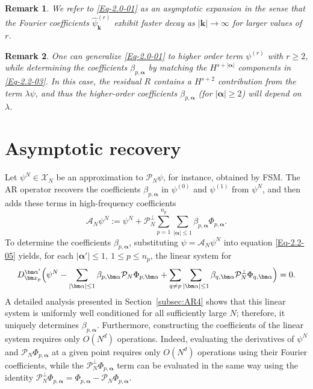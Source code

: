 \documentclass{sn-jnl}%
\numberwithin{equation}{section}
\theoremstyle{thmstyleone}%
\theoremstyle{thmstyletwo}%
\newtheorem{remark}{Remark}%
\theoremstyle{thmstylethree}%
\begin{document}
\begin{remark}
We refer to \eqref{Eq-2.0-01} as an asymptotic expansion in the sense that the Fourier coefficients  $\hat{\psi}_{\bm k}^{(r)}$  exhibit faster decay as $|\bm k|\to \infty$ for larger values of $r$.
\end{remark}
\begin{remark}
    One can generalize \eqref{Eq-2.0-01} to higher order term $\psi^{(r)}$ with $r\geq 2$, while determining the coefficients $\beta_{p,\bm \alpha}$ by matching the $H^{s+|\bm \alpha|}$ components in \eqref{Eq-2.2-03}.
    In this case, the residual $R$ contains a $H^{s+2}$ contribution from the term $\lambda\psi$, and thus the higher-order coefficients $\beta_{p,\bm \alpha}$ (for $|\bm \alpha| \geq 2 $) will depend on $\lambda$.
\end{remark}



\section{Asymptotic recovery}
\label{sec:postproc}
Let $\psi^N  \in \mathscr{X}_N$ be an approximation to $\mathcal{P}_N\psi$, for instance, obtained by FSM. The AR operator recovers the coefficients $\beta_{p,\bm \alpha}$ in $\psi^{(0)}$ and $\psi^{(1)}$ 
from $\psi^N$, and then adds these terms in high-frequency coefficients 
\begin{equation}
\label{Eq-3.0-01}
    \mathcal{A}_N\psi^N := \psi^N + \mathcal{P}^\perp_N\sum_{p=1}^{n_p}\sum_{|\bm \alpha|\leq 1}\beta_{p,\bm \alpha}\Phi_{p,\bm \alpha}.
\end{equation}
To determine the coefficients $\beta_{p,\bm \alpha}$, substituting $\psi=\mathcal{A}_N\psi^N$ into equation \eqref{Eq-2.2-05} yields,  for each $|\bm \alpha'|\leq 1,\ 1\leq p\leq n_p$, the linear system for 
\begin{equation}
\label{Eq-3.0-02}
     {D}^{\bm \alpha'}_{\bm x_p} \Bigl(\psi^N - \sum_{|\bm \alpha|\leq 1}\beta_{p,\bm \alpha}\mathcal{P}_N\Phi_{p,\bm \alpha} +\sum_{q\neq p}\sum_{|\bm \alpha|\leq 1}\beta_{q,\bm\alpha}\mathcal{P}_N^{\perp}\Phi_{q,\bm \alpha}\Bigr) =0.
\end{equation}
A detailed analysis presented in Section~\ref{subsec:AR4} shows that this linear system is uniformly well conditioned for all sufficiently large $N$; therefore, it uniquely determines $\beta_{p,\bm \alpha}$. Furthermore, constructing the coefficients of the linear system requires only $O(N^{d})$ operations. Indeed, evaluating the derivatives of $\psi^N$  and $\mathcal{P}_N\Phi_{p,\bm \alpha}$ at a given point requires only $O(N^d)$ operations using their Fourier coefficients, while the $\mathcal{P}_N^\perp\Phi_{p,\bm \alpha}$ term can be evaluated in the same way using the identity $\mathcal{P}_N^\perp\Phi_{p,\bm \alpha} = \Phi_{p,\bm \alpha}-\mathcal{P}_N\Phi_{p,\bm \alpha}$.
 
\end{document}
